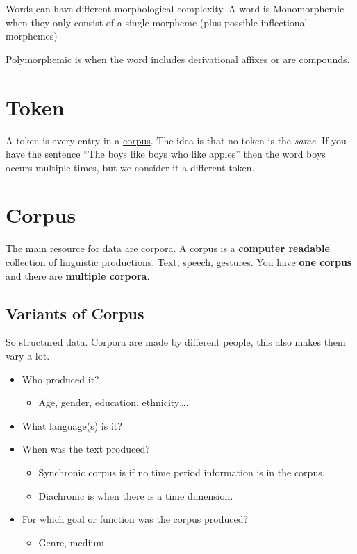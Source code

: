\documentclass[
  11pt,
  british,
]{article}
\providecommand{\tightlist}{%
  \setlength{\itemsep}{0pt}\setlength{\parskip}{0pt}}
\begin{document}
Words can have different morphological complexity. A word is
Monomorphemic when they only consist of a single morpheme (plus possible
inflectional morphemes)

Polymorphemic is when the word includes derivational affixes or are
compounds.

\hypertarget{token}{%
\section{Token}\label{token}}

A token is every entry in a \href{Corpus.md}{corpus}. The idea is that
no token is the \emph{same}. If you have the sentence ``The boys like
boys who like apples'' then the word boys occurs multiple times, but we
consider it a different token.

\hypertarget{corpus}{%
\section{Corpus}\label{corpus}}

The main resource for data are corpora. A corpus is a \textbf{computer
readable} collection of linguistic productions. Text, speech, gestures.
You have \textbf{one corpus} and there are \textbf{multiple corpora}.

\hypertarget{variants-of-corpus}{%
\subsection{Variants of Corpus}\label{variants-of-corpus}}

So structured data. Corpora are made by different people, this also
makes them vary a lot.

\begin{itemize}
\tightlist
\item
  Who produced it?

  \begin{itemize}
  \tightlist
  \item
    Age, gender, education, ethnicity\ldots.
  \end{itemize}
\item
  What language(s) is it?
\item
  When was the text produced?

  \begin{itemize}
  \tightlist
  \item
    Synchronic corpus is if no time period information is in the corpus.
  \item
    Diachronic is when there is a time dimension.
  \end{itemize}
\item
  For which goal or function was the corpus produced?

  \begin{itemize}
  \tightlist
  \item
    Genre, medium
  \end{itemize}
\end{itemize}
\end{document}
